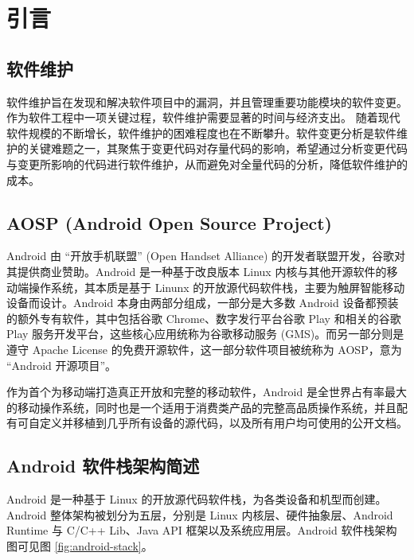 \section{引言}\label{introduction}

\subsection{软件维护}

软件维护旨在发现和解决软件项目中的漏洞，并且管理重要功能模块的软件变更。作为软件工程中一项关键过程，软件维护需要显著的时间与经济支出。\cite{SOLEIMANINEYSIANI2020106344} 随着现代软件规模的不断增长，软件维护的困难程度也在不断攀升。软件变更分析是软件维护的关键难题之一，其聚焦于变更代码对存量代码的影响，希望通过分析变更代码与变更所影响的代码进行软件维护，从而避免对全量代码的分析，降低软件维护的成本。

\subsection{AOSP (Android Open Source Project)}

Android 由 “开放手机联盟” (Open Handset Alliance) 的开发者联盟开发，谷歌对其提供商业赞助。Android 是一种基于改良版本 Linux 内核与其他开源软件的移动端操作系统，其本质是基于 Linunx 的开放源代码软件栈，主要为触屏智能移动设备而设计\cite{PLATFORMARCHITECTURE}。Android 本身由两部分组成，一部分是大多数 Android 设备都预装的额外专有软件，其中包括谷歌 Chrome、数字发行平台谷歌 Play 和相关的谷歌 Play 服务开发平台，这些核心应用统称为谷歌移动服务 (GMS)。而另一部分则是遵守 Apache License 的免费开源软件，这一部分软件项目被统称为 AOSP，意为 “Android 开源项目”。

作为首个为移动端打造真正开放和完整的移动软件，Android 是全世界占有率最大的移动操作系统，同时也是一个适用于消费类产品的完整高品质操作系统，并且配有可自定义并移植到几乎所有设备的源代码，以及所有用户均可使用的公开文档。

\subsection{Android 软件栈架构简述}

Android 是一种基于 Linux 的开放源代码软件栈，为各类设备和机型而创建。Android 整体架构被划分为五层，分别是 Linux 内核层、硬件抽象层、Android Runtime 与 C/C++ Lib、Java API 框架以及系统应用层。Android 软件栈架构图可见图 \ref{fig:android-stack}。

